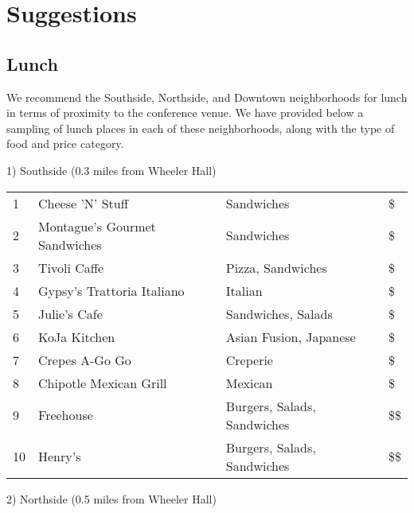\chapter{Suggestions}

\setlength\fboxsep{0pt}
\setlength\fboxrule{0.5pt}

\vspace{-1.5cm}
 \section{Lunch}

We recommend the Southside, Northside, and Downtown neighborhoods for lunch in terms of proximity to the conference venue. We have provided below a sampling of lunch places in each of these neighborhoods, along with the type of food and price category. 

\vspace{1mm}

1) Southside (0.3 miles from Wheeler Hall)

\begingroup
\small
\begin{multicols}{1}[]
    \begin{tabular}{p{0.3cm} p{4cm} p{5cm} p{0.5cm}}
        1 & Cheese 'N' Stuff & Sandwiches & \$\\
        2 & Montague's Gourmet Sandwiches & Sandwiches & \$\\
        3 & Tivoli Caffe & Pizza, Sandwiches & \$\\
        4 & Gypsy's Trattoria Italiano & Italian  & \$\\
        5 & Julie's Cafe & Sandwiches, Salads & \$\\ 
        6 & KoJa Kitchen & Asian Fusion, Japanese & \$\\
        7 & Crepes A-Go Go & Creperie & \$\\
        8 & Chipotle Mexican Grill & Mexican & \$\\
        9 & Freehouse & Burgers, Salads, Sandwiches & \$\$\\
        10 & Henry's & Burgers, Salads, Sandwiches & \$\$\\
    \end{tabular}
\end{multicols}
\endgroup
\normalsize 

2) Northside (0.5 miles from Wheeler Hall)

